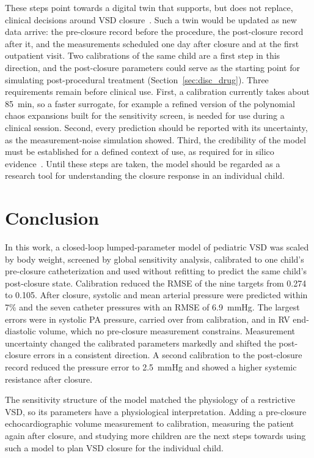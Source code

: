 These steps point towards a digital twin that supports, but does not replace, clinical decisions around VSD closure~\cite{CorralAcero2020,Niederer2021}. Such a twin would be updated as new data arrive: the pre-closure record before the procedure, the post-closure record after it, and the measurements scheduled one day after closure and at the first outpatient visit. Two calibrations of the same child are a first step in this direction, and the post-closure parameters could serve as the starting point for simulating post-procedural treatment (Section~\ref{sec:disc_drug}). Three requirements remain before clinical use. First, a calibration currently takes about 85~min, so a faster surrogate, for example a refined version of the polynomial chaos expansions built for the sensitivity screen, is needed for use during a clinical session. Second, every prediction should be reported with its uncertainty, as the measurement-noise simulation showed. Third, the credibility of the model must be established for a defined context of use, as required for in silico evidence~\cite{Viceconti2021}. Until these steps are taken, the model should be regarded as a research tool for understanding the closure response in an individual child.

\FloatBarrier
\section{Conclusion}
\label{sec:conclusion}
In this work, a closed-loop lumped-parameter model of pediatric VSD was scaled by body weight, screened by global sensitivity analysis, calibrated to one child's pre-closure catheterization and used without refitting to predict the same child's post-closure state. Calibration reduced the RMSE of the nine targets from 0.274 to 0.105. After closure, systolic and mean arterial pressure were predicted within 7\% and the seven catheter pressures with an RMSE of 6.9~mmHg. The largest errors were in systolic PA pressure, carried over from calibration, and in RV end-diastolic volume, which no pre-closure measurement constrains. Measurement uncertainty changed the calibrated parameters markedly and shifted the post-closure errors in a consistent direction. %
A second calibration to the post-closure record reduced the pressure error to 2.5~mmHg and showed a higher systemic resistance after closure.

The sensitivity structure of the model matched the physiology of a restrictive VSD, so its parameters have a physiological interpretation. Adding a pre-closure echocardiographic volume measurement to calibration, measuring the patient again after closure, and studying more children are the next steps towards using such a model to plan VSD closure for the individual child.
